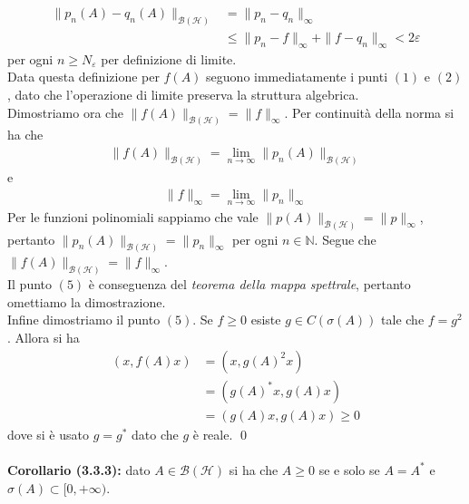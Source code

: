 \documentclass{article}
\numberwithin{equation}{subsection}
\begin{document}
\begin{align*}
    \|p_n(A) - q_n(A)\|_{\mathcal{B}(\mathcal{H})} &= \|p_n - q_n\|_\infty  \\
    &\leq \|p_n - f\|_\infty + \|f - q_n\|_\infty < 2\varepsilon 
\end{align*}
per ogni $n \geq N_\varepsilon$ per definizione di limite. \\
Data questa definizione per $f(A)$ seguono immediatamente i punti $(1)$ e $(2)$, dato che l'operazione di limite preserva la struttura algebrica. \\
Dimostriamo ora che $\|f(A)\|_{\mathcal{B}(\mathcal{H})} = \|f\|_\infty$. Per continuità della norma si ha che 
\begin{align*}
    \|f(A)\|_{\mathcal{B}(\mathcal{H})} = \lim_{n \rightarrow \infty}\|p_n(A)\|_{\mathcal{B}(\mathcal{H})} 
\end{align*}
e
\begin{align*}
    \|f\|_{\infty} = \lim_{n \rightarrow \infty}\|p_n\|_\infty 
\end{align*}
Per le funzioni polinomiali sappiamo che vale $\|p(A)\|_{\mathcal{B}(\mathcal{H})} = \|p\|_\infty$, pertanto $\|p_n(A)\|_{\mathcal{B}(\mathcal{H})} = \|p_n\|_\infty$ per ogni $n \in \mathbb{N}$. Segue che $\|f(A)\|_{\mathcal{B}(\mathcal{H})} = \|f\|_\infty$. \\
Il punto $(5)$ è conseguenza del \textit{teorema della mappa spettrale}, pertanto omettiamo la dimostrazione. \\
Infine dimostriamo il punto $(5)$. Se $f \geq 0$ esiste $g \in C(\sigma(A))$ tale che $f = g^2$. Allora si ha 
\begin{align*}
    (x, f(A)x) &= (x, g(A)^2x)  \\
    &= (g(A)^*x, g(A)x)  \\
    &= (g(A)x, g(A)x) \geq 0 
\end{align*}
dove si è usato $g = g^*$ dato che $g$ è reale. \qed \\ \\
\textbf{Corollario (3.3.3):} dato $A \in \mathcal{B}(\mathcal{H})$ si ha che $A \geq 0$ se e solo se $A = A^*$ e $\sigma(A) \subset [0, +\infty)$. \\
\end{document}
